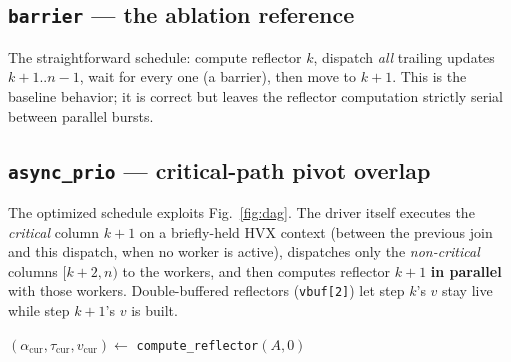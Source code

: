 \documentclass[11pt]{article}
\newcommand{\code}[1]{\texttt{\small #1}}
\begin{document}
\subsection{\code{barrier} --- the ablation reference}
The straightforward schedule: compute reflector $k$, dispatch \emph{all} trailing
updates $k{+}1..n{-}1$, wait for every one (a barrier), then move to $k{+}1$. This is
the baseline behavior; it is correct but leaves the reflector computation strictly
serial between parallel bursts.

\begin{algorithm}[H]
\caption{\code{qr\_dag\_barrier} (reference; no overlap)}
\For{$k \gets 0$ \KwTo $n-1$}{
  $(\alpha,\tau,v) \gets$ \texttt{compute\_reflector}$(A,k)$\;
  \texttt{dispatch} trailing updates for columns $[k{+}1, n)$\;
  \texttt{wait\_done}\tcp*{full barrier: all of step $k$ finishes}
  $A[k,k]\gets\alpha$;\quad zero $A[k{+}1{:}m,\,k]$\;
}
\end{algorithm}

\subsection{\code{async\_prio} --- critical-path pivot overlap}
The optimized schedule exploits Fig.~\ref{fig:dag}. The driver itself executes the
\emph{critical} column $k{+}1$ on a briefly-held HVX context (between the previous join
and this dispatch, when no worker is active), dispatches only the \emph{non-critical}
columns $[k{+}2,n)$ to the workers, and then computes reflector $k{+}1$
\textbf{in parallel} with those workers. Double-buffered reflectors (\code{vbuf[2]})
let step $k$'s $v$ stay live while step $k{+}1$'s $v$ is built.

\begin{algorithm}[H]
\caption{\code{qr\_dag\_async\_prio} (critical-path overlap)}
$(\alpha_{\mathrm{cur}},\tau_{\mathrm{cur}},v_{\mathrm{cur}}) \gets$ \texttt{compute\_reflector}$(A,0)$\;
\For{$k \gets 0$ \KwTo $n-1$}{
  \tcp{critical task $T(k,k{+}1)$: driver does it now, on HVX}
  \If{$k{+}1<n$}{ briefly lock HVX; \texttt{apply\_col}$(A,v_{\mathrm{cur}},\tau_{\mathrm{cur}},k{+}1)$; unlock\;}
  \tcp{non-critical columns go to the workers (all contexts)}
  \texttt{dispatch\_nonblocking}$(A,v_{\mathrm{cur}},\tau_{\mathrm{cur}},\,[k{+}2,n))$\;
  \tcp{overlap: build next reflector while workers run}
  \If{$k{+}1<n$}{ $(\alpha_{\mathrm{nxt}},\tau_{\mathrm{nxt}},v_{\mathrm{nxt}}) \gets$ \texttt{compute\_reflector}$(A,k{+}1)$\;}
  \texttt{wait\_done}\tcp*{join workers for $[k{+}2,n)$}
  $A[k,k]\gets\alpha_{\mathrm{cur}}$;\quad zero $A[k{+}1{:}m,\,k]$\;
  swap (cur, nxt)\;
}
\end{algorithm}
\end{document}
